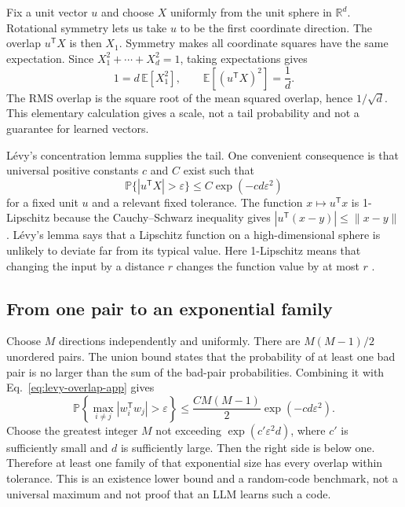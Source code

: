 \documentclass[
  aps,
  reprint,
  superscriptaddress,
  floatfix,
  nofootinbib,
  longbibliography
]{revtex4-2}
\newcommand{\R}{\mathbb{R}}
\newcommand{\E}{\mathbb{E}}
\newcommand{\Prob}{\mathbb{P}}
\newcommand{\T}{^{\mathsf T}}
\newcommand{\norm}[1]{\lVert #1\rVert}
\begin{document}
Fix a unit vector $u$ and choose $X$ uniformly from the unit sphere in
$\R^d$.  Rotational symmetry lets us take $u$ to be the first coordinate
direction.  The overlap $u\T X$ is then $X_1$.  Symmetry makes all coordinate
squares have the same expectation.  Since
$X_1^2+\cdots+X_d^2=1$, taking expectations gives
\begin{equation}
 1=d\,\E[X_1^2],
 \qquad
 \E[(u\T X)^2]=\frac1d.
 \label{eq:rms-overlap-app}
\end{equation}
The RMS overlap is the square root of the mean squared overlap, hence
$1/\sqrt d$.  This elementary calculation gives a scale, not a tail
probability and not a guarantee for learned vectors.

L\'evy's concentration lemma supplies the tail.  One convenient consequence
is that universal positive constants $c$ and $C$ exist such that
\begin{equation}
 \Prob\{|u\T X|>\varepsilon\}
 \leq C\exp(-c d\varepsilon^2)
 \label{eq:levy-overlap-app}
\end{equation}
for a fixed unit $u$ and a relevant fixed tolerance.  The function
$x\mapsto u\T x$ is 1-Lipschitz because the Cauchy--Schwarz inequality gives
$|u\T(x-y)|\leq\norm{x-y}$.  L\'evy's lemma says that a Lipschitz function on
a high-dimensional sphere is unlikely to deviate far from its typical value.
Here 1-Lipschitz means that changing the input by a distance $r$ changes the
function value by at most $r$
\cite{ledoux2001concentration,milman1986asymptotic}.

\subsection{From one pair to an exponential family}

Choose $M$ directions independently and uniformly.  There are
$M(M-1)/2$ unordered pairs.  The union bound states that the probability of at
least one bad pair is no larger than the sum of the bad-pair probabilities.
Combining it with Eq.~\eqref{eq:levy-overlap-app} gives
\begin{equation}
 \Prob\!\left\{
 \max_{i\ne j}|w_i\T w_j|>\varepsilon
 \right\}
 \leq \frac{C M(M-1)}{2}
 \exp(-c d\varepsilon^2).
 \label{eq:union-app}
\end{equation}
Choose the greatest integer $M$ not exceeding
$\exp(c'\varepsilon^2d)$, where $c'$ is sufficiently small and $d$ is
sufficiently large.  Then the right side is below one.  Therefore at least one
family of that exponential size has every overlap within tolerance.  This is
an existence lower bound and a random-code benchmark, not a universal maximum
and not proof that an LLM learns such a code.
\end{document}
